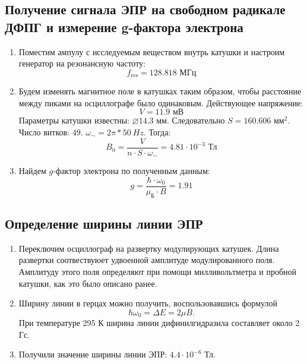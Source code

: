 \documentclass[a4paper, 12pt]{article}
\begin{document}
	\subsection{Получение сигнала ЭПР  на свободном радикале ДФПГ и измерение g-фактора электрона}
	\begin{enumerate}
		\item Поместим ампулу с исследуемым веществом внутрь катушки и настроим генератор на резонансную частоту:
		\begin{equation*}
			f_{\text{res}}=128.818\text{ МГц}
		\end{equation*}
		\item Будем изменять магнитное поле в катушках таким образом, чтобы расстояние между пиками на осциллографе было одинаковым. Действующее напряжение:
		\begin{equation*}
			V=11.9\text{ мВ}
		\end{equation*}
		Параметры катушки известны: $\diameter 14.3$ мм. Следовательно $S=160.606$ мм$^{2}$. Число витков: 49. $\omega_{\sim}=2\pi*50\ Hz$. Тогда:
		\begin{equation*}
			B_0=\frac{V}{n\cdot S\cdot\omega_{\sim}}=4.81\cdot 10^{-3}\text{ Тл}
		\end{equation*}
		\item Найдем $g$-фактор электрона по полученным данным:
		\begin{equation*}
			g=\frac{\hbar\cdot\omega_0}{\mu_{\text{Б}}\cdot B}=1.91
		\end{equation*}
	\end{enumerate}
	\subsection{Определение ширины линии ЭПР}
	\begin{enumerate}
		\item Переключим осциллограф на развертку модулирующих катушек. Длина развертки соотвествуюет удвоенной амплитуде модулированного поля. Амплитуду этого поля определяют при помощи милливольтметра и пробной катушки, как это было описано ранее.
		\item Ширину линии в герцах можно получить, воспользовавшись формулой
		\begin{equation}
			\hbar\omega_0=\Delta E=2\mu B.
		\end{equation}
		При температуре 295 К ширина линии дифинилгидразила составляет около 2 Гс.
		\item Получили значение ширины линии ЭПР: $4.4\cdot 10^{-6}$ Тл.
	\end{enumerate}
\end{document}
